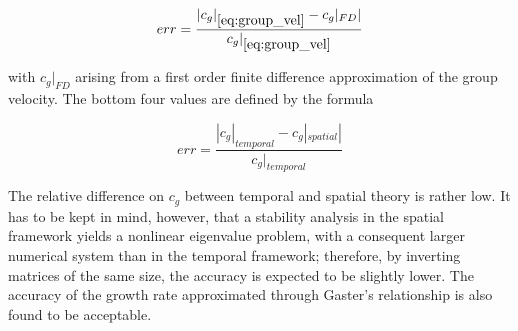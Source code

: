 $$
err = \dfrac{|c_g|_{\ref{eq:group_vel}} - c_g|_{FD}|}{c_g|_{\ref{eq:group_vel}}}
$$

with $c_g|_{FD}$ arising from a first order finite difference approximation of the group velocity. The
bottom four values are defined by the formula

$$
err = \dfrac{|c_g|_{temporal} - c_g|_{spatial}|}{c_g|_{temporal}}
$$

The relative difference on $c_g$ between temporal and spatial theory is rather low. It has to be kept
in mind, however, that a stability analysis in the spatial framework yields a nonlinear eigenvalue
problem, with a consequent larger numerical system than in the temporal framework; therefore, by
inverting matrices of the same size, the accuracy is expected to be slightly lower. The accuracy of
the growth rate approximated through Gaster’s relationship is also found to be acceptable.

